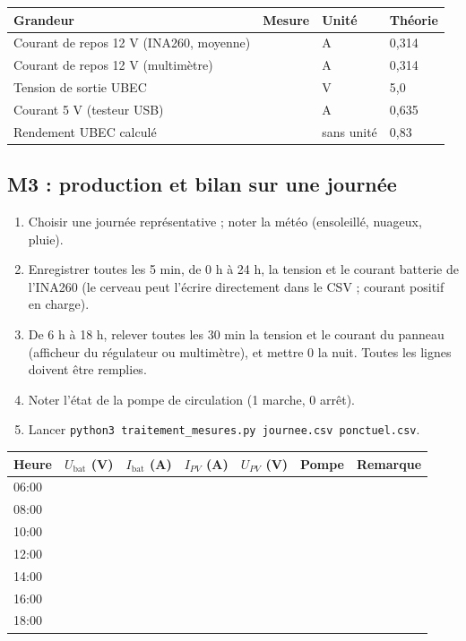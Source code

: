 \documentclass[11pt,a4paper]{article}
\begin{document}
\begin{center}
\begin{tabular}{|p{5cm}|p{3cm}|p{3cm}|p{3cm}|}
\hline
\textbf{Grandeur} & \textbf{Mesure} & \textbf{Unité} & \textbf{Théorie} \\
\hline
Courant de repos 12 V (INA260, moyenne) & & A & 0,314 \\[6pt]\hline
Courant de repos 12 V (multimètre) & & A & 0,314 \\[6pt]\hline
Tension de sortie UBEC & & V & 5,0 \\[6pt]\hline
Courant 5 V (testeur USB) & & A & 0,635 \\[6pt]\hline
Rendement UBEC calculé & & sans unité & 0,83 \\[6pt]\hline
\end{tabular}
\end{center}

\subsection{M3 : production et bilan sur une journée}
\begin{enumerate}[nosep]
\item Choisir une journée représentative ; noter la météo (ensoleillé, nuageux, pluie).
\item Enregistrer toutes les 5 min, de 0 h à 24 h, la tension et le courant batterie de l'INA260 (le cerveau peut l'écrire directement dans le CSV ; courant positif en charge).
\item De 6 h à 18 h, relever toutes les 30 min la tension et le courant du panneau (afficheur du régulateur ou multimètre), et mettre 0 la nuit. Toutes les lignes doivent être remplies.
\item Noter l'état de la pompe de circulation (1 marche, 0 arrêt).
\item Lancer \texttt{python3 traitement\_mesures.py journee.csv ponctuel.csv}.
\end{enumerate}

\begin{center}
\begin{tabular}{|p{1.4cm}|p{2.0cm}|p{2.0cm}|p{2.0cm}|p{2.0cm}|p{1.4cm}|p{2.0cm}|}
\hline
\textbf{Heure} & \textbf{$U_{\text{bat}}$ (V)} & \textbf{$I_{\text{bat}}$ (A)} & \textbf{$I_{PV}$ (A)} & \textbf{$U_{PV}$ (V)} & \textbf{Pompe} & \textbf{Remarque} \\
\hline
06:00 & & & & & & \\\hline
08:00 & & & & & & \\\hline
10:00 & & & & & & \\\hline
12:00 & & & & & & \\\hline
14:00 & & & & & & \\\hline
16:00 & & & & & & \\\hline
18:00 & & & & & & \\\hline
\end{tabular}
\end{center}
\end{document}
